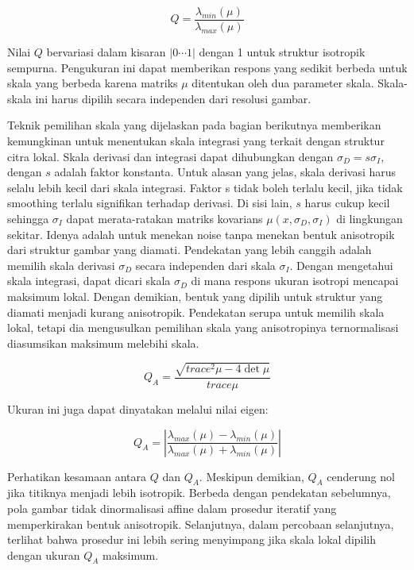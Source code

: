 \begin{equation}
  Q = \frac{\lambda_{min}(\mu)}{\lambda_{max}(\mu)}
\end{equation}

Nilai \(Q\) bervariasi dalam kisaran \(\left| 0 \cdots  1\right|\) dengan 1 untuk struktur isotropik sempurna. Pengukuran ini dapat memberikan respons yang sedikit berbeda untuk skala yang berbeda karena matriks \(\mu\) ditentukan oleh dua parameter skala. Skala-skala ini harus dipilih secara independen dari resolusi gambar.

Teknik pemilihan skala yang dijelaskan pada bagian berikutnya memberikan kemungkinan untuk menentukan skala integrasi yang terkait dengan struktur citra lokal. Skala derivasi dan integrasi dapat dihubungkan dengan \(\sigma_{D}=s \sigma_{I}\), dengan \(s\) adalah faktor konstanta. Untuk alasan yang jelas, skala derivasi harus selalu lebih kecil dari skala integrasi. Faktor s tidak boleh terlalu kecil, jika tidak smoothing terlalu signifikan terhadap derivasi. Di sisi lain, \(s\) harus cukup kecil sehingga \(\sigma_{I}\) dapat merata-ratakan matriks kovarians \(\mu(x,\sigma_{D},\sigma_{I})\) di lingkungan sekitar. Idenya adalah untuk menekan noise tanpa menekan bentuk anisotropik dari struktur gambar yang diamati. Pendekatan yang lebih canggih adalah memilih skala derivasi \(\sigma_{D}\) secara independen dari skala \(\sigma_{I}\). Dengan mengetahui skala integrasi, dapat dicari skala \(\sigma_{D}\) di mana respons ukuran isotropi mencapai maksimum lokal. Dengan demikian, bentuk yang dipilih untuk struktur yang diamati menjadi kurang anisotropik. Pendekatan serupa untuk memilih skala lokal, tetapi dia mengusulkan pemilihan skala yang anisotropinya ternormalisasi diasumsikan maksimum melebihi skala.

\begin{equation}
  Q_{A} = \frac{\sqrt{trace^{2}\mu - 4\det\mu}}{trace\mu}
\end{equation}

Ukuran ini juga dapat dinyatakan melalui nilai eigen:

\begin{equation*}
  Q_{A} = \left\lvert \frac{\lambda_{max}(\mu) - \lambda_{min}(\mu)}{\lambda_{max}(\mu) + \lambda_{min}(\mu)}\right\rvert 
\end{equation*}

Perhatikan kesamaan antara \(Q\) dan \(Q_{A}\). Meskipun demikian, \(Q_{A}\) cenderung nol jika titiknya menjadi lebih isotropik. Berbeda dengan pendekatan sebelumnya, pola gambar tidak dinormalisasi affine dalam prosedur iteratif yang memperkirakan bentuk anisotropik. Selanjutnya, dalam percobaan selanjutnya, terlihat bahwa prosedur ini lebih sering menyimpang jika skala lokal dipilih dengan ukuran \(Q_{A}\) maksimum.

